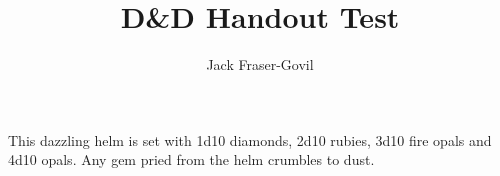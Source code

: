 \documentclass[]{rpghandout}
\title{D\&D Handout Test}
\author{Jack Fraser-Govil}
\begin{document}
    \maketitle{}

    This dazzling helm is set with 1d10 diamonds, 2d10 rubies, 3d10 fire opals and 4d10 opals. Any gem pried from the helm crumbles to dust.

	\Blindtext
\end{document}
